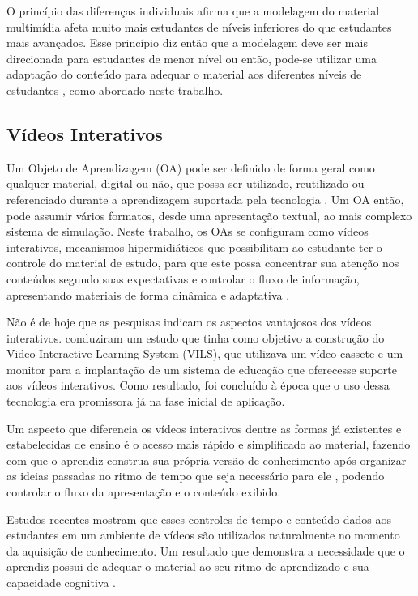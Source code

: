 O princípio das diferenças individuais afirma que a modelagem do material multimídia afeta muito mais estudantes de níveis inferiores do que estudantes mais avançados. Esse princípio diz então que a modelagem deve ser mais direcionada para estudantes de menor nível \cite{mayer2014} ou então, pode-se utilizar uma adaptação do conteúdo para adequar o material aos diferentes níveis de estudantes \cite{fragelli2010, brusilovsky1996, brusilovsky1994}, como abordado neste trabalho.

\subsection{Vídeos Interativos}

Um Objeto de Aprendizagem (OA) pode ser definido de forma geral como qualquer material, digital ou não, que possa ser utilizado, reutilizado ou referenciado durante a aprendizagem suportada pela tecnologia \cite{fragelli2010}. Um OA então, pode assumir vários formatos, desde uma apresentação textual, ao mais complexo sistema de simulação. Neste trabalho, os OAs se configuram como vídeos interativos, mecanismos hipermidiáticos que possibilitam ao estudante ter o controle do material de estudo, para que este possa concentrar sua atenção nos conteúdos segundo suas expectativas e controlar o fluxo de informação, apresentando materiais de forma dinâmica e adaptativa \cite{sturzbecher2013}. 

Não é de hoje que as pesquisas indicam os aspectos vantajosos dos vídeos interativos. \cite{gaudreau1984} conduziram um estudo que tinha como objetivo a construção do Video Interactive Learning System (VILS), que utilizava um vídeo cassete e um monitor para a implantação de um sistema de educação que oferecesse suporte aos vídeos interativos. Como resultado, foi concluído à época que o uso dessa tecnologia era promissora já na fase inicial de aplicação.

Um aspecto que diferencia os vídeos interativos dentre as formas já existentes e estabelecidas de ensino é o acesso mais rápido e simplificado ao material, fazendo com que o aprendiz construa sua própria versão de conhecimento após organizar as ideias passadas no ritmo de tempo que seja necessário para ele \cite{sturzbecher2013, zhang2005}, podendo controlar o fluxo da apresentação e o conteúdo exibido.

Estudos recentes mostram que esses controles de tempo e conteúdo dados aos estudantes em um ambiente de vídeos são utilizados naturalmente no momento da aquisição de conhecimento. Um resultado que demonstra a necessidade que o aprendiz possui de adequar o material ao seu ritmo de aprendizado e sua capacidade cognitiva \cite{chandler2004, mayer2001}.


